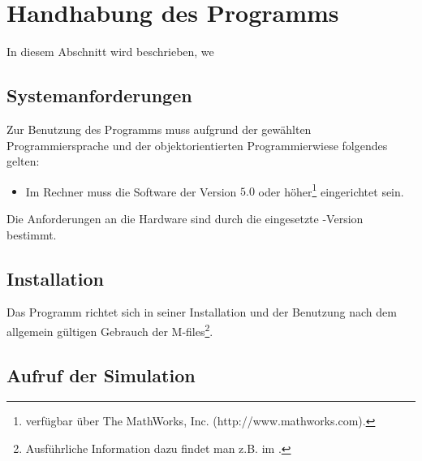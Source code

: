 \section{Handhabung des Programms}
\label{sc:handhabung}
In diesem Abschnitt wird beschrieben, we
\subsection{Systemanforderungen}

Zur Benutzung des Programms muss aufgrund der gewählten Programmiersprache und
der objektorientierten Programmierwiese folgendes gelten:

\begin{itemize}
	\item Im Rechner muss die Software \matlab der Version $5.0$ oder
	höher\footnote{ \matlab verfügbar über The MathWorks, Inc.
	(http://www.mathworks.com).} eingerichtet sein.
\end{itemize}

Die Anforderungen an die Hardware sind durch die eingesetzte \matlab-Version
bestimmt.

\subsection{Installation}

Das Programm richtet sich in seiner Installation und der Benutzung nach dem
allgemein gültigen Gebrauch der \matlab M-files\footnote{
Ausführliche Information dazu findet man z.B. im \cite{MATLAB-Buch}.}.

\subsection{Aufruf der Simulation}%
